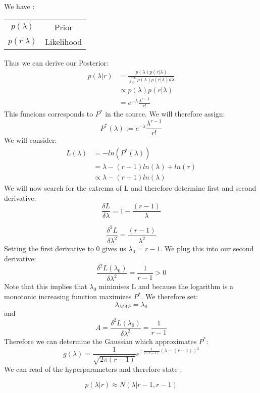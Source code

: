 We have :
\begin{center}
    \begin{tabular}{ c c }
     $p(\lambda)$ & Prior \\ 
     $p(r | \lambda)$ & Likelihood \\  
    \end{tabular}
    \end{center}
    Thus we can derive our Posterior:
    \begin{align*}
        p(\lambda |r)   &= \frac{p( \lambda )p(r|\lambda)}{\int_0^{\infty}p(\lambda)p(r|\lambda)d\lambda}\\ 
                        & \propto p(\lambda)p(r|\lambda)\\
                        &= e^{-\lambda}\frac{\lambda^{r-1}}{r!}
    \end{align*}
    This funcions corresponds to $P^*$ in the source. We will therefore  assign:
    \[
    P^*(\lambda) := e^{-\lambda}\frac{\lambda^{r-1}}{r!}   
    \]
    We will consider:
    \begin{align*}
        L(\lambda)  &= -ln(P^*(\lambda))\\
                    &= \lambda -(r-1)ln(\lambda)+ln(r)\\
                    &\propto \lambda -(r-1)ln(\lambda)
    \end{align*}
    We will now search for the extrema of L and therefore determine first and second derivative:
    \[
    \frac{\delta L}{\delta \lambda}= 1-\frac{(r-1)}{\lambda}    
    \]

    \[
    \frac{\delta^2 L}{\delta \lambda^2}= \frac{(r-1)}{\lambda^2}    
    \]
    Setting the first derivative to 0 gives us $\lambda_0=r-1$. We plug this into our second derivative:
    \[
        \frac{\delta^2 L(\lambda_0)}{\delta \lambda^2} =\frac{1}{r-1}  >0
    \]
    Note that this implies that $\lambda_0$ minimises L and because the logarithm is a monotonic increasing function maximizes $P^*$. We therefore set:
    \[
    \lambda_{MAP} = \lambda_0    
    \]
    and 
    \[
    A=   \frac{\delta^2 L(\lambda_0)}{\delta \lambda^2} =\frac{1}{r-1}  
    \]
    Therefore we can determine the Gaussian which approximates $P^*$:
    \[
    g(\lambda) = \frac{1}{\sqrt{2\pi(r-1)}}e^{-\frac{1}{2(r-1)}(\lambda-(r-1))^2}    
    \]
    We can read of the hyperparameters and therefore state :

    \[
    p(\lambda|r) \approx N(\lambda|r-1,r-1)   
    \]